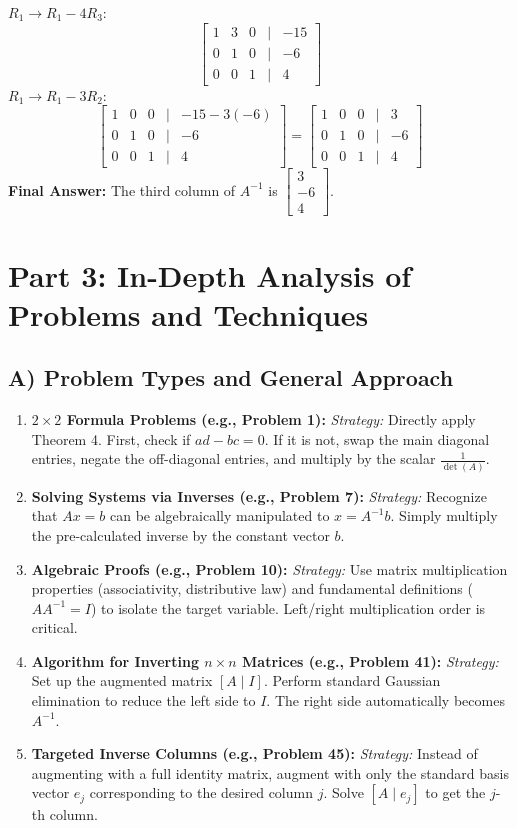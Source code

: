 \documentclass[12pt]{article}
\begin{document}
$R_1 \to R_1 - 4R_3$:
\[ \begin{bmatrix} 1 & 3 & 0 & \mid & -15 \\ 0 & 1 & 0 & \mid & -6 \\ 0 & 0 & 1 & \mid & 4 \end{bmatrix} \]
$R_1 \to R_1 - 3R_2$:
\[ \begin{bmatrix} 1 & 0 & 0 & \mid & -15 - 3(-6) \\ 0 & 1 & 0 & \mid & -6 \\ 0 & 0 & 1 & \mid & 4 \end{bmatrix} = \begin{bmatrix} 1 & 0 & 0 & \mid & 3 \\ 0 & 1 & 0 & \mid & -6 \\ 0 & 0 & 1 & \mid & 4 \end{bmatrix} \]
\textbf{Final Answer:} The third column of $A^{-1}$ is $\begin{bmatrix} 3 \\ -6 \\ 4 \end{bmatrix}$.

\newpage
\section{Part 3: In-Depth Analysis of Problems and Techniques}

\subsection{A) Problem Types and General Approach}
\begin{enumerate}
    \item \textbf{$2 \times 2$ Formula Problems (e.g., Problem 1):} 
    \textit{Strategy:} Directly apply Theorem 4. First, check if $ad-bc = 0$. If it is not, swap the main diagonal entries, negate the off-diagonal entries, and multiply by the scalar $\frac{1}{\det(A)}$.
    \item \textbf{Solving Systems via Inverses (e.g., Problem 7):} 
    \textit{Strategy:} Recognize that $Ax=b$ can be algebraically manipulated to $x = A^{-1}b$. Simply multiply the pre-calculated inverse by the constant vector $b$.
    \item \textbf{Algebraic Proofs (e.g., Problem 10):}
    \textit{Strategy:} Use matrix multiplication properties (associativity, distributive law) and fundamental definitions ($A A^{-1} = I$) to isolate the target variable. Left/right multiplication order is critical.
    \item \textbf{Algorithm for Inverting $n \times n$ Matrices (e.g., Problem 41):}
    \textit{Strategy:} Set up the augmented matrix $[A \mid I]$. Perform standard Gaussian elimination to reduce the left side to $I$. The right side automatically becomes $A^{-1}$.
    \item \textbf{Targeted Inverse Columns (e.g., Problem 45):}
    \textit{Strategy:} Instead of augmenting with a full identity matrix, augment with only the standard basis vector $e_j$ corresponding to the desired column $j$. Solve $[A \mid e_j]$ to get the $j$-th column.
\end{enumerate}
\end{document}
